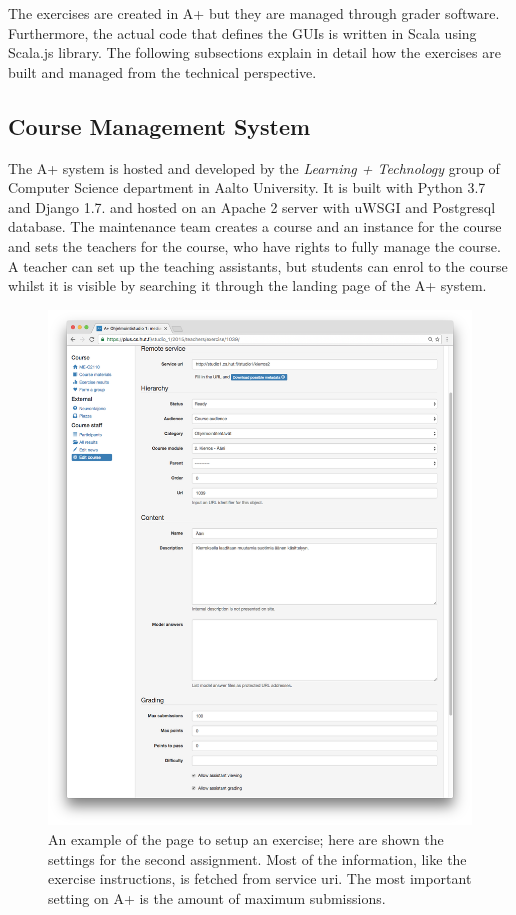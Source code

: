 The exercises are created in A+ but they are managed through grader software. Furthermore, the actual code that defines the GUIs is written in Scala using Scala.js library. The following subsections explain in detail how the exercises are built and managed from the technical perspective.


\subsection{Course Management System}

The A+ system is hosted and developed by the \emph{Learning + Technology} group of Computer Science department in Aalto University. It is built with Python 3.7 and Django 1.7. and hosted on an Apache 2 server with uWSGI and Postgresql database. The maintenance team creates a course and an instance for the course and sets the teachers for the course, who have rights to fully manage the course. A teacher can set up the teaching assistants, but students can enrol to the course whilst it is visible by searching it through the landing page of the A+ system.

\begin{figure}[!ht]
\vspace{15px}
	\begin{center}
		\includegraphics[width=\textwidth]{images/exercise-definition.png}
	\end{center}
	\caption[asdf]{\small{An example of the page to setup an exercise; here are shown the settings for the second assignment. Most of the information, like the exercise instructions, is fetched from service uri. The most important setting on A+ is the amount of maximum submissions.}}
	\label{figure:exercise-definition}
\end{figure}

